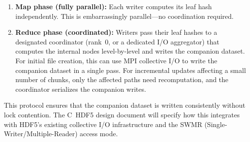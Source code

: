 \documentclass[11pt]{article}
\begin{document}
\begin{enumerate}[nosep]
  \item \textbf{Map phase (fully parallel):} Each writer computes its leaf hash
    independently. This is embarrassingly parallel---no coordination required.
  \item \textbf{Reduce phase (coordinated):} Writers pass their leaf hashes to a
    designated coordinator (rank~0, or a dedicated I/O aggregator) that computes
    the internal nodes level-by-level and writes the companion dataset. For
    initial file creation, this can use MPI collective I/O to write the companion
    dataset in a single pass. For incremental updates affecting a small number of
    chunks, only the affected paths need recomputation, and the coordinator
    serializes the companion writes.
\end{enumerate}

\noindent This protocol ensures that the companion dataset is written
consistently without lock contention. The C~HDF5 design document will specify
how this integrates with HDF5's existing collective I/O infrastructure and the
SWMR (Single-Writer/Multiple-Reader) access mode.
\end{document}
